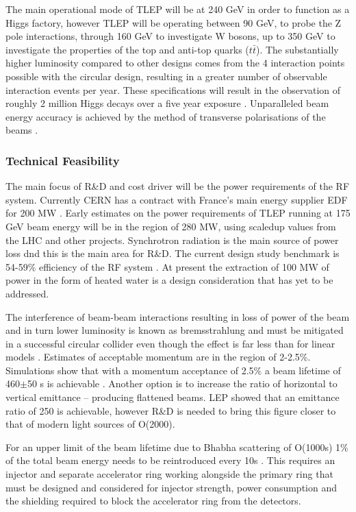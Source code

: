 The main operational mode of TLEP will be at 240 GeV in order to function as a Higgs factory, however TLEP will be operating between 90 GeV, to probe the Z pole interactions, through 160 GeV to investigate W bosons, up to 350 GeV to investigate the properties of the top and anti-top quarks ($t\bar{t}$). The substantially higher luminosity compared to other designs comes from the 4 interaction points possible with the circular design, resulting in a greater number of observable interaction events per year. These specifications will result in the observation of roughly 2 million Higgs decays over a five year exposure \cite{TLEP:CERNReport}. Unparalleled beam energy accuracy is achieved by the method of transverse polarisations of the beams \cite{TLEP:Review}.

\subsubsection{Technical Feasibility}

The main focus of R\&D and cost driver will be the power requirements of the RF system. Currently CERN has a contract with France's main energy supplier EDF for 200 MW \cite{TLEP:Luminosity}. Early estimates on the power requirements of TLEP running at 175 GeV beam energy will be in the region of 280 MW, using scaled\textendash up values from the LHC and other projects. Synchrotron radiation is the main source of power loss dnd this is the main area for R\&D. The current design study benchmark is 54-59\% efficiency of the RF system \cite{TLEP:Review}. At present the extraction of 100 MW of power in the form of heated water is a design consideration that has yet to be addressed.

The interference of beam-beam interactions resulting in loss of power of the beam and in turn lower luminosity is known as bremsstrahlung and must be mitigated in a successful circular collider even though the effect is far less than for linear models \cite{TLEP:Luminosity}. Estimates of acceptable momentum are in the region of 2-2.5\%. Simulations show that with a momentum acceptance of 2.5\% a beam lifetime of 460$\pm$50 s is achievable \cite{TLEP:EnergyRestriction}. Another option is to increase the ratio of horizontal to vertical emittance – producing flattened beams. LEP showed that an emittance ratio of 250 is achievable, however R\&D is needed to bring this figure closer to that of modern light sources of O(2000).

For an upper limit of the beam lifetime due to Bhabha scattering of O(1000s) 1\% of the total beam energy needs to be reintroduced every 10s \cite{TLEP:Janot} \cite{TLEP:CERNOverview}. This requires an injector and separate accelerator ring working alongside the primary ring that must be designed and considered for injector strength, power consumption and the shielding required to block the accelerator ring from the detectors. 

